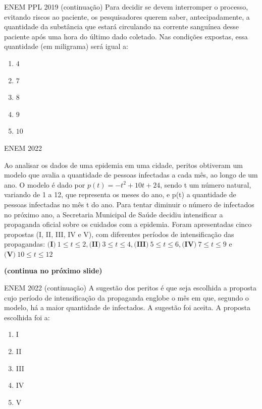 \documentclass[11pt]{beamer}
\newif\ifgab
\newcommand{\gab}[1]{%
  \ifgab
    \textcolor{red!80!black}{\textbf{#1}}%
  \else
    #1%
  \fi
}
\begin{document}
\begin{frame}{ENEM PPL 2019 (continuação)}
    Para decidir se devem interromper o processo, evitando riscos ao paciente, os pesquisadores querem saber, antecipadamente, a quantidade da substância que estará circulando na corrente sanguínea desse paciente após uma hora do último dado coletado. Nas condições expostas, essa quantidade (em miligrama) será igual a:

    \begin{enumerate}[a]
        \item $4$
        \item \gab{$7$} %
        \item $8$ 
        \item $9$ 
        \item $10$ 
    \end{enumerate}
\end{frame}

\begin{frame}{ENEM 2022}

    Ao analisar os dados de uma epidemia em uma cidade, peritos obtiveram um modelo que avalia a quantidade de pessoas infectadas a cada mês, ao longo de um ano. O modelo é dado por $p(t)=-t^{2}+10t+24$, sendo t um número natural, variando de 1 a 12, que representa os meses do ano, e p(t) a quantidade de pessoas infectadas no mês t do ano. Para tentar diminuir o número de infectados no próximo ano, a Secretaria Municipal de Saúde decidiu intensificar a propaganda oficial sobre os cuidados com a epidemia. Foram apresentadas cinco propostas (I, II, III, IV e V), com diferentes períodos de intensificação das propagandas: $\textbf{(I)}\ 1 \leq t \leq 2, \textbf{(II)}\ 3 \leq t \leq 4, \textbf{(III)}\ 5 \leq t \leq 6, \textbf{(IV)}\ 7 \leq t \leq 9$ e $\textbf{(V)}\ 10 \leq t \leq 12$

    \vfill
    \textbf{(continua no próximo slide)}
\end{frame}
\begin{frame}{ENEM 2022 (continuação)}
    A sugestão dos peritos é que seja escolhida a proposta cujo período de intensificação da propaganda englobe o mês em que, segundo o modelo, há a maior quantidade de infectados. A sugestão foi aceita. A proposta escolhida foi a:

    \begin{enumerate}[a]
            \item I
            \item II
            \item \gab{III} %
            \item IV 
            \item V
        \end{enumerate}
\end{frame}
\end{document}
